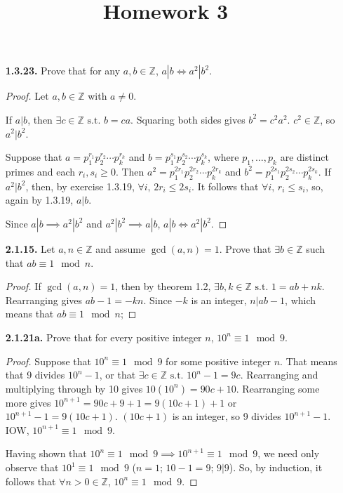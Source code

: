 \documentclass[12pt]{article}
\title{Homework 3}
\newcommand{\zee}{\mathbb{Z}}
\newcommand{\st}{\text{ s.t. }}
\begin{document}
\begin{itemize}
\item[\textbf{1.3.23.}] Prove that for any $a,b\in\zee$, $a|b \iff a^2|b^2$.

\begin{proof}
  Let $a,b\in\zee$ with $a\neq0$.
  \par
  If $a|b$, then $\exists c\in\zee\st b=ca$.
  Squaring both sides gives $b^2 = c^2 a^2$.
  $c^2 \in\zee$, so $a^2|b^2$.
  \par
  Suppose that $a=p_1^{r_1}p_2^{r_2}\dotsb p_k^{r_k}$ and $b=p_1^{s_1}p_2^{s_2}\dotsb p_k^{s_k}$, where $p_1,\dotsc, p_k$ are distinct primes and each $r_i,s_i\ge0$.
  Then $a^2=p_1^{2r_1}p_2^{2r_2}\dotsb p_k^{2r_k}$ and $b^2=p_1^{2s_1}p_2^{2s_2}\dotsb p_k^{2s_k}$.
  If $a^2|b^2$, then, by exercise 1.3.19, $\forall i,\,2r_i\le 2s_i$.
  It follows that $\forall i,\,r_i\le s_i$, so, again by 1.3.19, $a|b$.
  \par
  Since $a|b \implies a^2|b^2$ and $a^2|b^2 \implies a|b$, $a|b \iff a^2|b^2$.
\end{proof}

\item[\textbf{2.1.15.}] Let $a,n\in\zee$ and assume $\gcd(a,n)=1$. Prove that $\exists b\in\zee$ such that $ab\equiv1\mod n$.

\begin{proof}
If $\gcd(a,n)=1$, then by theorem 1.2, $\exists b, k \in \zee \st 1 = ab + nk$.
Rearranging gives $ab-1=-kn$.
Since $-k$ is an integer, $n|ab-1$, which means that $ab\equiv1\mod n$;
\end{proof}

\item[\textbf{2.1.21a.}] Prove that for every positive integer $n$, $10^n\equiv 1\mod 9$.

\begin{proof}
Suppose that $10^n\equiv 1\mod 9$ for some positive integer $n$.
That means that 9 divides $10^n - 1$, or that $\exists c \in \zee \st 10^n - 1 = 9c$.
Rearranging and multiplying through by 10 gives $10(10^n)=90c+10$.
Rearranging some more gives $10^{n+1}=90c+9+1=9(10c+1)+1$ or $10^{n+1}-1=9(10c+1)$.
$(10c+1)$ is an integer, so 9 divides $10^{n+1}-1$.
IOW, $10^{n+1}\equiv 1\mod 9$.
\par
Having shown that $10^n\equiv 1\mod 9 \implies 10^{n+1}\equiv 1\mod 9$, we need only observe that $10^1\equiv1\mod9$ (\small{$n=1$; $10-1=9$; $9|9$}).
So, by induction, it follows that $\forall n>0 \in \zee$, $10^n\equiv 1\mod 9$.
\end{proof}


\end{itemize}
\end{document}
